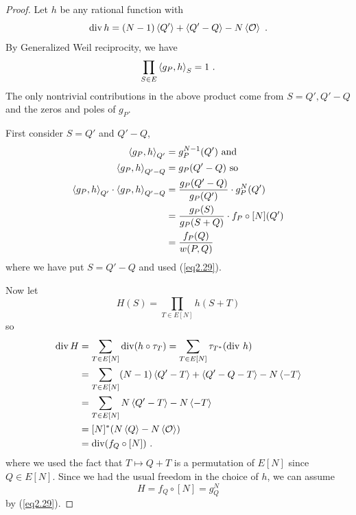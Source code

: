 \begin{proof}
Let $h$ be any rational function with
$$
\operatorname{div}h = (N-1) \left\langle Q' \right \rangle + \left\langle Q' - Q \right \rangle - N \left\langle \mathcal{O} \right \rangle\ .
$$
By Generalized Weil reciprocity, we have
$$
\prod_{S\in E}\left\langle g_{P}, h \right \rangle_{S} = 1\ .
$$
The only nontrivial contributions in the above product come from $S =Q',Q'-Q$ and the zeros and poles of $g_{P}$.

First consider $S =Q'$ and $Q'-Q$,
\begin{align*}
\left\langle g_{P}, h \right \rangle_{Q'}   &= g_{P}^{N-1}(Q')\text{ and}\\
\left\langle g_{P}, h \right \rangle_{Q'-Q} &= g_{P}(Q'-Q)\text{ so}\\
\left\langle g_{P}, h \right \rangle_{Q'} \cdot \left\langle g_{P}, h \right \rangle_{Q'-Q} &= \frac{g_{P}(Q'-Q)}{g_{P}(Q')}\cdot g_{P}^{N}(Q')\\
&=\frac{g_{P}(S)}{g_{P}(S+Q)}\cdot f_{P}\circ[N](Q')\\
&=\frac{f_{P}(Q)}{w(P,Q)}
\end{align*}
where we have put $S=Q'-Q$ and used (\ref{eq2.29}).

Now let
$$
H(S)=\prod_{T\in E[N]}h(S+T)
$$
so
\begin{align*}
\operatorname{div}H&=\sum_{T\in E[N]}\operatorname{div}(h\circ\tau_{T})=\sum_{T\in E[N]}\tau_{T^{*}}(\operatorname{div}\, h)\\
&=\sum_{T\in E[N]}(N-1)\left\langle Q'-T \right \rangle+\left\langle Q'-Q-T \right \rangle - N \left\langle -T \right \rangle\\
&=\sum_{T\in E[N]} N \left\langle Q'-T \right \rangle - N \left\langle -T \right \rangle\\
&=[N]^{*}(N\left\langle Q \right \rangle-N\left\langle \mathcal{O} \right \rangle)\\
&=\operatorname{div}(f_{Q}\circ[N])\ .
\end{align*}
where we used the fact that $T \mapsto Q+T$ is a permutation of $E[N]$ since $Q\in E[N]$. Since we had the usual freedom in the choice of $h$, we can assume
$$
H=f_{Q}\circ[N]=g_{Q}^{N}
$$
by (\ref{eq2.29}).


\end{proof}
